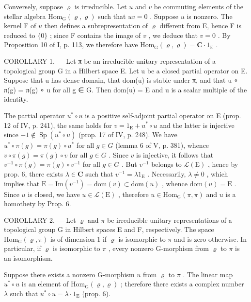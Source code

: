 Conversely, suppose \(\varrho\) is irreducible. Let \(u\) and \(v\) be commuting elements of the stellar algebra \(\mathrm{Hom}_{\mathrm{G}}(\varrho, \varrho)\) such that \(uv = 0\) . Suppose \(u\) is nonzero. The kernel F of \(u\) then defines a subrepresentation of \(\varrho\) different from E, hence F is reduced to \(\{0\}\) ; since F contains the image of \(v\) , we deduce that \(v = 0\) . By Proposition 10 of I, p. 113, we therefore have \(\mathrm{Hom}_{\mathrm{G}}(\varrho, \varrho) = \mathbf{C} \cdot 1_{\mathrm{E}}\) .

COROLLARY 1. --- Let π be an irreducible unitary representation of a topological group G in a Hilbert space E. Let u be a closed partial operator on E. Suppose that u has dense domain, that dom(u) is stable under π, and that u ∘ π(g) = π(g) ∘ u for all g ∈ G. Then dom(u) = E and u is a scalar multiple of the identity.

The partial operator \(u^{*} \circ u\) is a positive self-adjoint partial operator on E (prop. 12 of IV, p. 241), the same holds for \(v = 1_{\mathrm{E}} + u^{*} \circ u\) and the latter is injective since \(-1 \notin \operatorname{Sp}(u^{*} \circ u)\) (prop. 17 of IV, p. 248). We have \(u^{*} \circ \pi(g) = \pi(g) \circ u^{*}\) for all \(g \in G\) (lemma 6 of V, p. 381), whence \(v \circ \pi(g) = \pi(g) \circ v\) for all \(g \in G\) . Since \(v\) is injective, it follows that \(v^{-1} \circ \pi(g) = \pi(g) \circ v^{-1}\) for all \(g \in G\) . But \(v^{-1}\) belongs to \(\mathcal{L}(\mathrm{E})\) , hence by prop. 6, there exists \(\lambda \in \mathbf{C}\) such that \(v^{-1} = \lambda 1_{\mathrm{E}}\) . Necessarily, \(\lambda \neq 0\) , which implies that \(\mathrm{E} = \mathrm{Im}(v^{-1}) = \mathrm{dom}(v) \subset \mathrm{dom}(u)\) , whence \(\mathrm{dom}(u) = \mathrm{E}\) . Since \(u\) is closed, we have \(u \in \mathcal{L}(\mathrm{E})\) , therefore \(u \in \mathrm{Hom}_{\mathrm{G}}(\pi, \pi)\) and \(u\) is a homothety by Prop. 6.

COROLLARY 2. --- Let \(\varrho\) and \(\pi\) be irreducible unitary representations of a topological group G in Hilbert spaces E and F, respectively. The space \(\mathrm{Hom}_{\mathrm{G}}(\varrho, \pi)\) is of dimension 1 if \(\varrho\) is isomorphic to \(\pi\) and is zero otherwise. In particular, if \(\varrho\) is isomorphic to \(\pi\) , every nonzero G-morphism from \(\varrho\) to \(\pi\) is an isomorphism.

Suppose there exists a nonzero G-morphism \(u\) from \(\varrho\) to \(\pi\) . The linear map \(u^{*} \circ u\) is an element of \(\mathrm{Hom}_{\mathrm{G}}(\varrho, \varrho)\) ; therefore there exists a complex number \(\lambda\) such that \(u^{*} \circ u = \lambda \cdot 1_{\mathrm{E}}\) (prop. 6).

